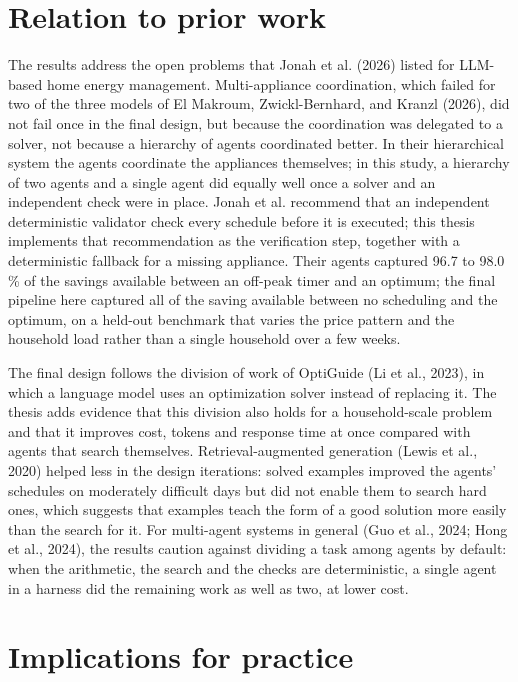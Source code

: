 \documentclass[12pt,a4paper]{report}
\begin{document}
\section{Relation to prior work}
\label{sec:discussion-prior}

The results address the open problems that Jonah et al. (2026) listed for
LLM-based home energy management. Multi-appliance coordination, which
failed for two of the three models of El Makroum, Zwickl-Bernhard, and
Kranzl (2026), did not fail once in the final design, but because the
coordination was delegated to a solver, not because a hierarchy of
agents coordinated better. In their hierarchical system the agents
coordinate the appliances themselves; in this study, a hierarchy of two
agents and a single agent did equally well once a solver and an
independent check were in place. Jonah et al. recommend that an
independent deterministic validator check every schedule before it is
executed; this thesis implements that recommendation as the
verification step, together with a deterministic fallback for a missing
appliance. Their agents captured 96.7 to 98.0\,\% of the savings
available between an off-peak timer and an optimum; the final pipeline
here captured all of the saving available between no scheduling and
the optimum, on a held-out benchmark that varies the price pattern and
the household load rather than a single household over a few weeks.

The final design follows the division of work of OptiGuide (Li et al.,
2023), in which a language model uses an optimization solver instead of
replacing it. The thesis adds evidence that this division also holds
for a household-scale problem and that it improves cost, tokens and
response time at once compared with agents that search themselves.
Retrieval-augmented generation (Lewis et al., 2020) helped less in the
design iterations: solved examples improved the agents' schedules on
moderately difficult days but did not enable them to search hard ones,
which suggests that examples teach the form of a good solution more
easily than the search for it. For multi-agent systems in general
(Guo et al., 2024; Hong et al., 2024), the results caution against
dividing a task among agents by default: when the arithmetic, the
search and the checks are deterministic, a single agent in a harness
did the remaining work as well as two, at lower cost.

\section{Implications for practice}
\label{sec:implications}
\end{document}
